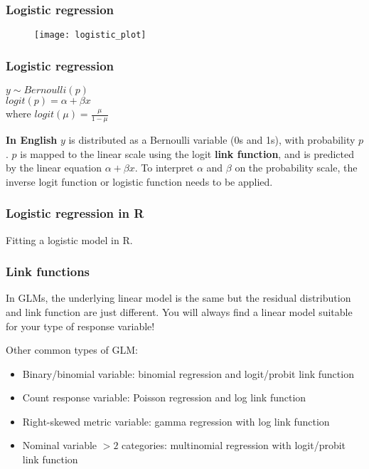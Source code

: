 \documentclass{beamer}
\begin{document}
\begin{frame}
  \frametitle{Logistic regression}
  \vspace{-1cm}
  \begin{figure}
    \texttt{[image: logistic\_plot]}
  \end{figure}
\end{frame}
\begin{frame}
  \frametitle{Logistic regression}
  \centering
  $y \sim Bernoulli(p)$ \\\vspace{0.5cm}
  $logit(p) = \alpha + \beta x$ \\\vspace{0.5cm}
  where $logit(\mu) = \frac{\mu}{1 - \mu}$\vspace{1cm}
  \begin{block}{\textbf{In English}}
    $y$ is distributed as a Bernoulli variable (0s and 1s), with probability $p$. $p$ is mapped to the linear scale using the logit \textbf{link function}, and is predicted by the linear equation $\alpha + \beta x$. To interpret $\alpha$ and $\beta$ on the probability scale, the inverse logit function or logistic function needs to be applied.
\end{block}
\end{frame}
\begin{frame}
  \frametitle{Logistic regression in R}
  Fitting a logistic model in R.
\end{frame}
\begin{frame}
  \frametitle{Link functions}
  In GLMs, the underlying linear model is the same but the \alert{residual distribution} and \alert{link function} are just different. You will always find a linear model suitable for your type of response variable! \\ \vspace{1cm}

  Other common types of GLM:
  \begin{itemize}
    \item Binary/binomial variable: binomial regression and logit/probit link function
    \item Count response variable: Poisson regression and log link function
    \item Right-skewed metric variable: gamma regression with log link function
    \item Nominal variable $> 2$ categories: multinomial regression with logit/probit link function
  \end{itemize}
\end{frame}
\end{document}
